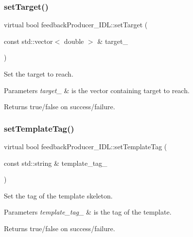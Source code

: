 \subsubsection{\texorpdfstring{set\+Target()}{setTarget()}}
{\footnotesize\ttfamily virtual bool feedback\+Producer\+\_\+\+I\+D\+L\+::set\+Target (\begin{DoxyParamCaption}\item[{const std\+::vector$<$ double $>$ \&}]{target\+\_\+ }\end{DoxyParamCaption})\hspace{0.3cm}{\ttfamily [virtual]}}



Set the target to reach. 


\begin{DoxyParams}{Parameters}
{\em target\+\_\+} & is the vector containing target to reach. \\
\hline
\end{DoxyParams}
\begin{DoxyReturn}{Returns}
true/false on success/failure. 
\end{DoxyReturn}
\mbox{\label{classfeedbackProducer__IDL_a9d73388746fdad03567b1930c964c61d}} 
\subsubsection{\texorpdfstring{set\+Template\+Tag()}{setTemplateTag()}}
{\footnotesize\ttfamily virtual bool feedback\+Producer\+\_\+\+I\+D\+L\+::set\+Template\+Tag (\begin{DoxyParamCaption}\item[{const std\+::string \&}]{template\+\_\+tag\+\_\+ }\end{DoxyParamCaption})\hspace{0.3cm}{\ttfamily [virtual]}}



Set the tag of the template skeleton. 


\begin{DoxyParams}{Parameters}
{\em template\+\_\+tag\+\_\+} & is the tag of the template. \\
\hline
\end{DoxyParams}
\begin{DoxyReturn}{Returns}
true/false on success/failure. 
\end{DoxyReturn}
\mbox{\label{classfeedbackProducer__IDL_a0faabb9844bf01590a85e67bd857d7ac}} 
